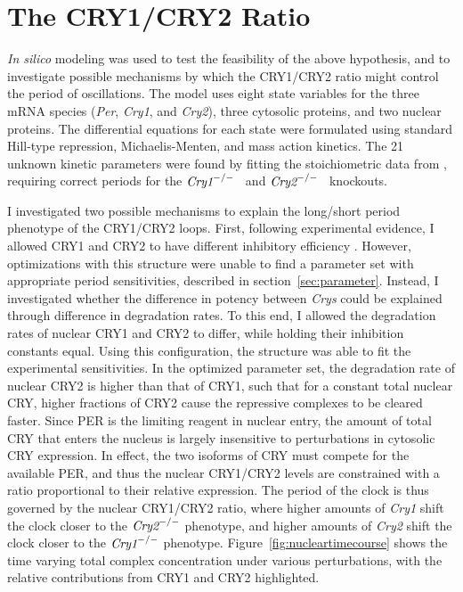 \section{The CRY1/CRY2 Ratio}
{\it In silico} modeling was used to test the feasibility of the above hypothesis, and to investigate possible mechanisms by which the CRY1/CRY2 ratio might control the period of oscillations. The model uses eight state variables for the three mRNA species ({\it Per}, {\it Cry1}, and {\it Cry2}), three cytosolic proteins, and two nuclear proteins. The differential equations for each state were formulated using standard Hill-type repression, Michaelis-Menten, and mass action kinetics. The 21 unknown kinetic parameters were found by fitting the stoichiometric data from \cite{Lee2001}, requiring correct periods for the $\text{\it Cry1}^{-/-}$  and $\text{\it Cry2}^{-/-}$  knockouts.

I investigated two possible mechanisms to explain the long/short period phenotype of the CRY1/CRY2 loops. First, following experimental evidence, I allowed CRY1 and CRY2 to have different inhibitory efficiency \cite{GriffinJr.1999}. However, optimizations with this structure were unable to find a parameter set with appropriate period sensitivities, described in section~\ref{sec:parameter}. Instead, I investigated whether the difference in potency between {\it Crys} could be explained through difference in degradation rates. To this end, I allowed the degradation rates of nuclear CRY1 and CRY2 to differ, while holding their inhibition constants equal. Using this configuration, the structure was able to fit the experimental sensitivities. In the optimized parameter set, the degradation rate of nuclear CRY2 is higher than that of CRY1, such that for a constant total nuclear CRY, higher fractions of CRY2 cause the repressive complexes to be cleared faster. Since PER is the limiting reagent in nuclear entry, the amount of total CRY that enters the nucleus is largely insensitive to perturbations in cytosolic CRY expression. In effect, the two isoforms of CRY must compete for the available PER, and thus the nuclear CRY1/CRY2 levels are constrained with a ratio proportional to their relative expression. The period of the clock is thus governed by the nuclear CRY1/CRY2 ratio, where higher amounts of {\it Cry1} shift the clock closer to the $\text{\it Cry2}^{-/-}$ phenotype, and higher amounts of {\it Cry2} shift the clock closer to the $\text{\it Cry1}^{-/-}$ phenotype. Figure~\ref{fig:nucleartimecourse} shows the time varying total complex concentration under various perturbations, with the relative contributions from CRY1 and CRY2 highlighted.

